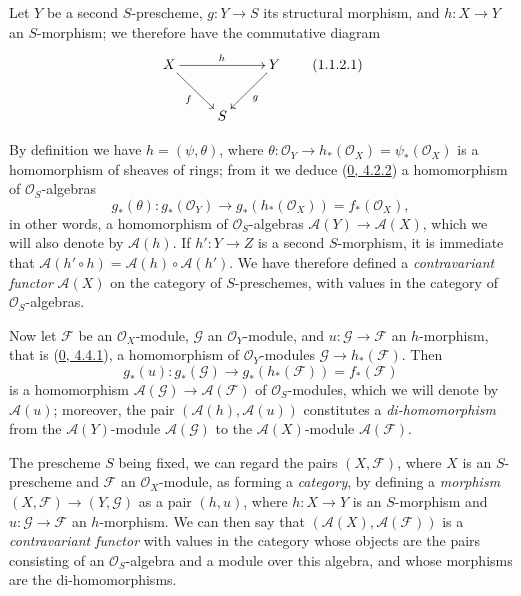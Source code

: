 \begin{env}[1.1.2]
\label{II.1.1.2}
Let $Y$ be a second $S$-prescheme, $g:Y\to S$ its structural morphism,
and $h:X\to Y$ an $S$-morphism; we therefore have the commutative diagram
\[
  \xymatrix{
    X\ar[rr]^h\ar[rd]_f && Y\ar[ld]^g\\
    & S
  }
  \tag{1.1.2.1}\label{II.1.1.2.1}
\]

By definition we have $h=(\psi,\theta)$, where
$\theta:\mathcal{O}_Y\to h_*(\mathcal{O}_X)=\psi_*(\mathcal{O}_X)$ is a
homomorphism of sheaves of rings; from it we deduce
(\hyperref[0.4.2.2]{0, 4.2.2}) a homomorphism of
$\mathcal{O}_S$-algebras
\[
  g_*(\theta):g_*(\mathcal{O}_Y)\to
  g_*(h_*(\mathcal{O}_X))=f_*(\mathcal{O}_X),
\]
in other words, a homomorphism of $\mathcal{O}_S$-algebras
$\mathcal{A}(Y)\to\mathcal{A}(X)$, which we will also denote by
$\mathcal{A}(h)$. If $h':Y\to Z$ is a second $S$-morphism, it is immediate
that $\mathcal{A}(h'\circ h)=\mathcal{A}(h)\circ\mathcal{A}(h')$. We have
therefore defined a \emph{contravariant functor} $\mathcal{A}(X)$ on the
category of $S$-preschemes, with values in the category of
$\mathcal{O}_S$-algebras.

Now let $\mathcal{F}$ be an $\mathcal{O}_X$-module, $\mathcal{G}$ an
$\mathcal{O}_Y$-module, and $u:\mathcal{G}\to\mathcal{F}$ an $h$-morphism,
that is (\hyperref[0.4.4.1]{0, 4.4.1}), a homomorphism of
$\mathcal{O}_Y$-modules $\mathcal{G}\to h_*(\mathcal{F})$. Then
\[
  g_*(u):g_*(\mathcal{G})\to g_*(h_*(\mathcal{F}))=f_*(\mathcal{F})
\]
is a homomorphism $\mathcal{A}(\mathcal{G})\to
\mathcal{A}(\mathcal{F})$ of $\mathcal{O}_S$-modules, which we will denote by
$\mathcal{A}(u)$; moreover, the pair
$(\mathcal{A}(h),\mathcal{A}(u))$ constitutes a \emph{di-homomorphism} from
the $\mathcal{A}(Y)$-module $\mathcal{A}(\mathcal{G})$ to the
$\mathcal{A}(X)$-module $\mathcal{A}(\mathcal{F})$.
\end{env}

\begin{env}[1.1.3]
\label{II.1.1.3}
The prescheme $S$ being fixed, we can regard the pairs
$(X,\mathcal{F})$, where $X$ is an $S$-prescheme and $\mathcal{F}$ an
$\mathcal{O}_X$-module, as forming a \emph{category}, by defining a
\emph{morphism} $(X,\mathcal{F})\to(Y,\mathcal{G})$ as a pair $(h,u)$,
where $h:X\to Y$ is an $S$-morphism and $u:\mathcal{G}\to\mathcal{F}$ an
$h$-morphism. We can then say that
$(\mathcal{A}(X),\mathcal{A}(\mathcal{F}))$ is a \emph{contravariant
functor} with values in the category whose objects are the pairs
consisting of an $\mathcal{O}_S$-algebra and a module over this algebra, and
whose morphisms are the di-homomorphisms.
\end{env}

